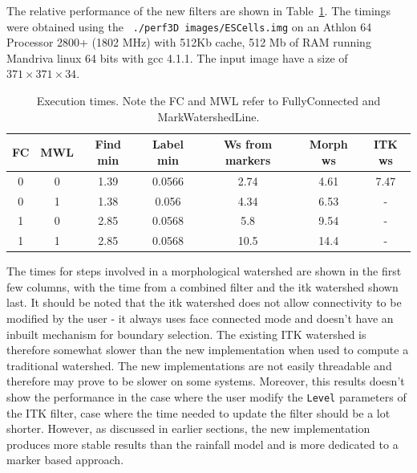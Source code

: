 \documentclass{InsightArticle}
\begin{document}
The relative performance of the new filters are shown in
Table~\ref{tbl:perf}. The timings were obtained using the {\tt
./perf3D images/ESCells.img} on an Athlon 64 
Processor 2800+ (1802 MHz) with 512Kb cache, 512 Mb of RAM running
Mandriva linux 64 bits with gcc 4.1.1. The input image have a size of
$371 \times 371 \times 34$.

\begin{table}[htbp]
\centering
\begin{tabular}{cc|ccc|cc}
\hline
FC & MWL & Find min &  Label min & Ws from markers & Morph ws &  ITK ws \\
\hline
\hline
0 &      0 &      1.39 &   0.0566 & 2.74 &   4.61 &   7.47 \\
0 &      1 &      1.38 &   0.056  & 4.34 &   6.53 &   - \\
1 &      0 &      2.85 &   0.0568 & 5.8  &   9.54 &   - \\
1 &      1 &      2.85 &   0.0568 & 10.5 &   14.4 &   - \\
\hline
\end{tabular}
\caption{Execution times. Note the FC and MWL refer to FullyConnected and MarkWatershedLine.\label{tbl:perf}}
\end{table}

The times for steps involved in a
morphological watershed are shown in the first few columns, with the
time from a combined filter and the itk watershed shown last. It
should be noted that the itk watershed does not allow connectivity to
be modified by the user - it always uses face connected mode and
doesn't have an inbuilt mechanism for boundary selection. The existing
ITK watershed is therefore somewhat slower than the new implementation
when used to compute a traditional watershed. The new implementations
are not easily threadable and therefore may prove to be slower on some
systems. Moreover, this results doesn't show the performance in the
case where the user modify the \verb$Level$ parameters of the ITK
filter, case where the time needed to update the filter should be a lot
shorter. However, as discussed in earlier sections, the new
implementation produces more stable results than the rainfall model
and is more dedicated to a marker based approach.
\end{document}

